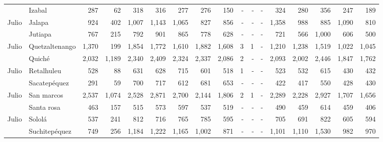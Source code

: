 \begin{landscape}
\begin{center}
\begin{longtable}{llrrrrrrrrrrrrrrr}
\rowcolor{color1!5!white}\multicolumn{1}{l}{	\footnotesize	 Julio 	}&	 Izabal 	&	 287 	&	 62 	&	 318 	&	 316 	&	 277 	&	 276 	&	 150 	&	 -   	&	 -   	&	 -   	&	 324 	&	 280 	&	 356 	&	 247 	&	 189 	\\
\multicolumn{1}{l}{	\footnotesize	 Julio 	}&	 Jalapa 	&	 924 	&	 402 	&	 1,007 	&	 1,143 	&	 1,065 	&	 827 	&	 856 	&	 -   	&	 -   	&	 -   	&	 1,358 	&	 988 	&	 885 	&	 1,090 	&	 810 	\\
\rowcolor{color1!5!white}\multicolumn{1}{l}{	\footnotesize	 Julio 	}&	 Jutiapa 	&	 767 	&	 215 	&	 792 	&	 901 	&	 865 	&	 778 	&	 628 	&	 -   	&	 -   	&	 -   	&	 721 	&	 566 	&	 1,000 	&	 606 	&	 500 	\\
\multicolumn{1}{l}{	\footnotesize	 Julio 	}&	 Quetzaltenango 	&	 1,370 	&	 199 	&	 1,854 	&	 1,772 	&	 1,610 	&	 1,882 	&	 1,608 	&	 3 	&	 1 	&	 -   	&	 1,210 	&	 1,238 	&	 1,519 	&	 1,022 	&	 1,045 	\\
\rowcolor{color1!5!white}\multicolumn{1}{l}{	\footnotesize	 Julio 	}&	 Quiché 	&	 2,032 	&	 1,189 	&	 2,340 	&	 2,409 	&	 2,324 	&	 2,337 	&	 2,086 	&	 2 	&	 -   	&	 -   	&	 2,093 	&	 2,002 	&	 2,446 	&	 1,847 	&	 1,762 	\\
\multicolumn{1}{l}{	\footnotesize	 Julio 	}&	 Retalhuleu 	&	 528 	&	 88 	&	 631 	&	 628 	&	 715 	&	 601 	&	 518 	&	 1 	&	 -   	&	 -   	&	 523 	&	 532 	&	 615 	&	 430 	&	 432 	\\
\rowcolor{color1!5!white}\multicolumn{1}{l}{	\footnotesize	 Julio 	}&	 Sacatepéquez 	&	 291 	&	 59 	&	 700 	&	 717 	&	 612 	&	 681 	&	 653 	&	 -   	&	 -   	&	 -   	&	 422 	&	 417 	&	 550 	&	 428 	&	 430 	\\
\multicolumn{1}{l}{	\footnotesize	 Julio 	}&	 San marcos 	&	 2,537 	&	 1,074 	&	 2,528 	&	 2,871 	&	 2,700 	&	 2,144 	&	 1,806 	&	 2 	&	 1 	&	 -   	&	 2,289 	&	 2,228 	&	 2,927 	&	 1,707 	&	 1,656 	\\
\rowcolor{color1!5!white}\multicolumn{1}{l}{	\footnotesize	 Julio 	}&	 Santa rosa 	&	 463 	&	 157 	&	 515 	&	 573 	&	 597 	&	 537 	&	 519 	&	 -   	&	 -   	&	 -   	&	 490 	&	 459 	&	 614 	&	 459 	&	 406 	\\
\multicolumn{1}{l}{	\footnotesize	 Julio 	}&	 Sololá 	&	 537 	&	 241 	&	 812 	&	 716 	&	 765 	&	 785 	&	 595 	&	 -   	&	 -   	&	 -   	&	 705 	&	 691 	&	 822 	&	 605 	&	 594 	\\
\rowcolor{color1!5!white}\multicolumn{1}{l}{	\footnotesize	 Julio 	}&	 Suchitepéquez 	&	 749 	&	 256 	&	 1,184 	&	 1,222 	&	 1,165 	&	 1,002 	&	 871 	&	 -   	&	 -   	&	 -   	&	 1,101 	&	 1,110 	&	 1,530 	&	 982 	&	 970 	\\

\end{longtable}
\end{center}
\end{landscape}

